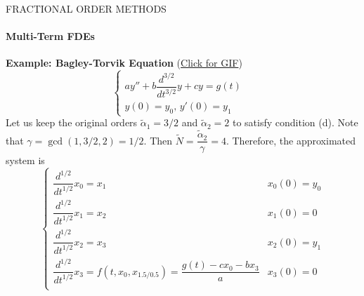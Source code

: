 \begin{frame}{FRACTIONAL ORDER METHODS}
\framesubtitle{Multi-Term FDEs}
    \textbf{Example: Bagley-Torvik Equation} (\href{run:nonNewtonianFluid.gif}{Click for GIF})\\\vspace{0.3cm}
    \begin{equation}
    \begin{cases}
        ay''+b\dfrac{d^{3/2}}{dt^{3/2}}y+cy=g(t)&\\
        y(0)=y_0,\,y'(0)=y_1
    \end{cases}
    \end{equation}
    Let us keep the original orders  $\tilde{\alpha}_1=3/2$ and $\tilde{\alpha}_2=2$ to satisfy condition (d). Note that $\gamma=\operatorname{gcd}(1,3/2,2)=1/2$. Then $\tilde{N}=\dfrac{\tilde{\alpha}_2}{\gamma}=4$. Therefore, the approximated system is
    \begin{equation}
        \begin{cases}
        \dfrac{d^{1/2}}{dt^{1/2}}x_0=x_1&x_0(0)=y_0\\[5pt]
        \dfrac{d^{1/2}}{dt^{1/2}}x_1=x_2&x_1(0)=0\\[5pt]
        \dfrac{d^{1/2}}{dt^{1/2}}x_2=x_3&x_2(0)=y_1\\[5pt]
        \dfrac{d^{1/2}}{dt^{1/2}}x_3=f\left(t,x_0,x_{1.5/0.5}\right)=\dfrac{g(t)-cx_0-bx_3}{a}&x_3(0)=0\\
        \end{cases}
    \end{equation}
\end{frame}

